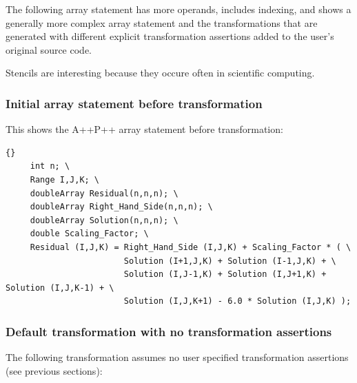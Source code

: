 \documentclass[10pt]{article}
\begin{document}
   The following array statement has more operands, includes indexing, and shows a generally
more complex array statement and the transformations that are generated with different explicit
transformation assertions added to the user's original source code.


   Stencils are interesting because they occure often in scientific computing.

\subsubsection{Initial array statement before transformation}

   This shows the A++\/P++ array statement before transformation:

\vspace{0.5in}

\begin{lstlisting}{}
     int n; \
     Range I,J,K; \
     doubleArray Residual(n,n,n); \
     doubleArray Right_Hand_Side(n,n,n); \
     doubleArray Solution(n,n,n); \
     double Scaling_Factor; \
     Residual (I,J,K) = Right_Hand_Side (I,J,K) + Scaling_Factor * ( \
                        Solution (I+1,J,K) + Solution (I-1,J,K) + \
                        Solution (I,J-1,K) + Solution (I,J+1,K) + Solution (I,J,K-1) + \
                        Solution (I,J,K+1) - 6.0 * Solution (I,J,K) );
\end{lstlisting}


\subsubsection{Default transformation with no transformation assertions}

The following transformation assumes no user specified transformation assertions (see previous sections):
\end{document}
